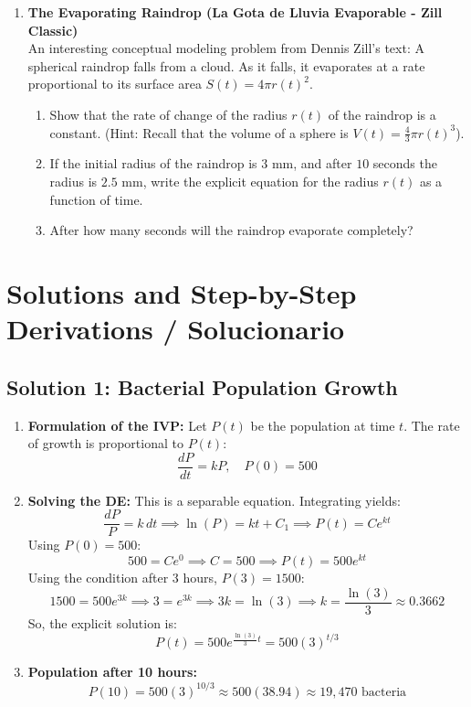 \documentclass[11pt,letterpaper]{article}
\begin{document}
\begin{enumerate}[label=\textbf{Problem \arabic*:}, leftmargin=*]
    \item \textbf{The Evaporating Raindrop (La Gota de Lluvia Evaporable - Zill Classic)} \\
    An interesting conceptual modeling problem from Dennis Zill's text: A spherical raindrop falls from a cloud. As it falls, it evaporates at a rate proportional to its surface area $S(t) = 4\pi r(t)^2$.
    \begin{enumerate}[label=(\alph*)]
        \item Show that the rate of change of the radius $r(t)$ of the raindrop is a constant. (Hint: Recall that the volume of a sphere is $V(t) = \frac{4}{3}\pi r(t)^3$).
        \item If the initial radius of the raindrop is $3\text{ mm}$, and after $10$ seconds the radius is $2.5\text{ mm}$, write the explicit equation for the radius $r(t)$ as a function of time.
        \item After how many seconds will the raindrop evaporate completely?
    \end{enumerate}

\end{enumerate}

\newpage
\section{Solutions and Step-by-Step Derivations / Solucionario}

\subsection*{Solution 1: Bacterial Population Growth}
\begin{enumerate}[label=(\alph*)]
    \item \textbf{Formulation of the IVP:}
    Let $P(t)$ be the population at time $t$. The rate of growth is proportional to $P(t)$:
    \[ \frac{dP}{dt} = kP, \quad P(0) = 500 \]
    
    \item \textbf{Solving the DE:}
    This is a separable equation. Integrating yields:
    \[ \frac{dP}{P} = k\,dt \implies \ln(P) = kt + C_1 \implies P(t) = C e^{kt} \]
    Using $P(0) = 500$:
    \[ 500 = C e^0 \implies C = 500 \implies P(t) = 500 e^{kt} \]
    Using the condition after $3$ hours, $P(3) = 1500$:
    \[ 1500 = 500 e^{3k} \implies 3 = e^{3k} \implies 3k = \ln(3) \implies k = \frac{\ln(3)}{3} \approx 0.3662 \]
    So, the explicit solution is:
    \[ P(t) = 500 e^{\frac{\ln(3)}{3}t} = 500 (3)^{t/3} \]

    \item \textbf{Population after 10 hours:}
    \[ P(10) = 500 (3)^{10/3} \approx 500 (38.94) \approx 19,470 \text{ bacteria} \]
\end{enumerate}
\end{document}
